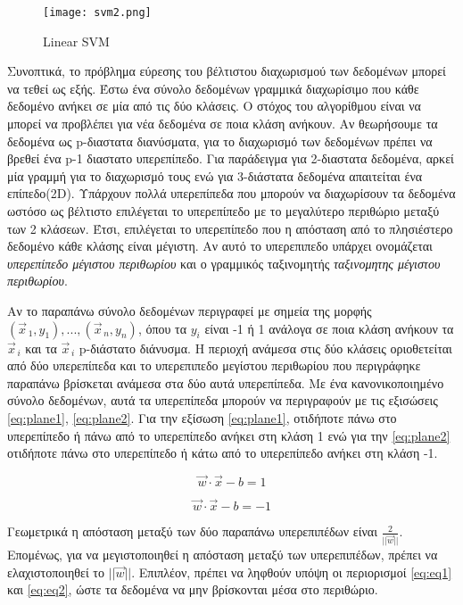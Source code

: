 \begin{figure}[!h]
    \centering
      \texttt{[image: svm2.png]} \caption{Linear SVM}
\label{figure:svm}  
\end{figure}


Συνοπτικά, το πρόβλημα εύρεσης του βέλτιστου διαχωρισμού των δεδομένων μπορεί να τεθεί ως εξής. Έστω ένα σύνολο δεδομένων γραμμικά διαχωρίσιμο που κάθε δεδομένο ανήκει σε μία από τις δύο κλάσεις. Ο στόχος του αλγορίθμου είναι να μπορεί να  προβλέπει για νέα δεδομένα σε ποια κλάση ανήκουν. Αν θεωρήσουμε τα δεδομένα ως p-διαστατα διανύσματα, για το διαχωρισμό των δεδομένων πρέπει να βρεθεί ένα p-1 διαστατο υπερεπίπεδο. Για παράδειγμα για 2-διαστατα δεδομένα, αρκεί μία γραμμή για το διαχωρισμό τους ενώ για 3-διάστατα δεδομένα απαιτείται ένα επίπεδο(2D). Υπάρχουν πολλά υπερεπίπεδα που μπορούν να διαχωρίσουν τα δεδομένα ωστόσο ως βέλτιστο επιλέγεται το υπερεπίπεδο με το μεγαλύτερο περιθώριο μεταξύ των 2 κλάσεων. Έτσι, επιλέγεται το υπερεπίπεδο που η απόσταση από το πλησιέστερο δεδομένο κάθε κλάσης είναι μέγιστη. Αν αυτό το υπερεπιπεδο υπάρχει ονομάζεται\textit{ υπερεπίπεδο μέγιστου περιθωρίου} και ο γραμμικός ταξινομητής \textit{ταξινομητης μέγιστου περιθωρίου}. 



Αν το παραπάνω σύνολο  δεδομένων περιγραφεί  με σημεία της μορφής $(\vec{x}_{\,1},y_{1}),...,(\vec{x}_{\,n},y_{n})$, όπου τα $y_{i}$ είναι -1 ή 1 ανάλογα σε ποια κλάση ανήκουν τα $\vec{x}_{\,i}$ και τα $\vec{x}_{\,i}$ p-διάστατο διάνυσμα. Η περιοχή ανάμεσα στις δύο κλάσεις οριοθετείται από δύο υπερεπίπεδα και το  υπερεπιπεδο μεγίστου περιθωρίου που περιγράφηκε παραπάνω  βρίσκεται ανάμεσα στα δύο αυτά υπερεπίπεδα. Με ένα κανονικοποιημένο σύνολο δεδομένων, αυτά τα υπερεπίπεδα μπορούν να περιγραφούν με τις εξισώσεις \ref{eq:plane1}, \ref{eq:plane2}. Για την εξίσωση \ref{eq:plane1}, οτιδήποτε πάνω στο υπερεπίπεδο ή πάνω από το υπερεπίπεδο ανήκει στη κλάση 1 ενώ για την \ref{eq:plane2} οτιδήποτε πάνω στο υπερεπίπεδο ή κάτω από το υπερεπίπεδο ανήκει στη κλάση -1. 


\begin{equation} \label{eq:plane1}
\vec{w} \cdot  \vec{x} - b = 1
\end{equation}



\begin{equation} \label{eq:plane2}
\vec{w} \cdot  \vec{x} - b = -1
\end{equation}


Γεωμετρικά η απόσταση μεταξύ των δύο παραπάνω υπερεπιπέδων είναι $\frac{2}{||\vec{w}||}$. Επομένως, για να μεγιστοποιηθεί η απόσταση μεταξύ των υπερεπιπέδων, πρέπει να ελαχιστοποιηθεί το $||\vec{w}||$. Επιπλέον, πρέπει να ληφθούν υπόψη οι περιορισμοί \ref{eq:eq1} και \ref{eq:eq2}, ώστε τα δεδομένα  να μην βρίσκονται μέσα στο περιθώριο.


